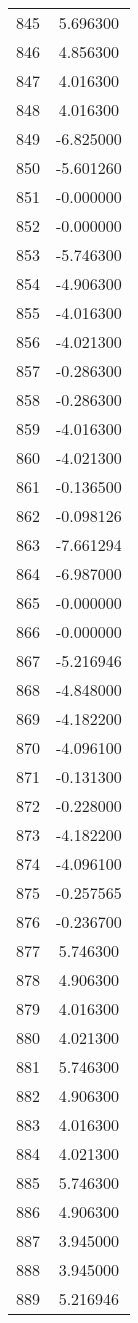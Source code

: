 \documentclass[12pt]{article}
\begin{document}
\begin{longtable}{@{}cc@{}}
845 & 5.696300 \\
846 & 4.856300 \\
847 & 4.016300 \\
848 & 4.016300 \\
849 & -6.825000 \\
850 & -5.601260 \\
851 & -0.000000 \\
852 & -0.000000 \\
853 & -5.746300 \\
854 & -4.906300 \\
855 & -4.016300 \\
856 & -4.021300 \\
857 & -0.286300 \\
858 & -0.286300 \\
859 & -4.016300 \\
860 & -4.021300 \\
861 & -0.136500 \\
862 & -0.098126 \\
863 & -7.661294 \\
864 & -6.987000 \\
865 & -0.000000 \\
866 & -0.000000 \\
867 & -5.216946 \\
868 & -4.848000 \\
869 & -4.182200 \\
870 & -4.096100 \\
871 & -0.131300 \\
872 & -0.228000 \\
873 & -4.182200 \\
874 & -4.096100 \\
875 & -0.257565 \\
876 & -0.236700 \\
877 & 5.746300 \\
878 & 4.906300 \\
879 & 4.016300 \\
880 & 4.021300 \\
881 & 5.746300 \\
882 & 4.906300 \\
883 & 4.016300 \\
884 & 4.021300 \\
885 & 5.746300 \\
886 & 4.906300 \\
887 & 3.945000 \\
888 & 3.945000 \\
889 & 5.216946 \\

\end{longtable}
\end{document}
